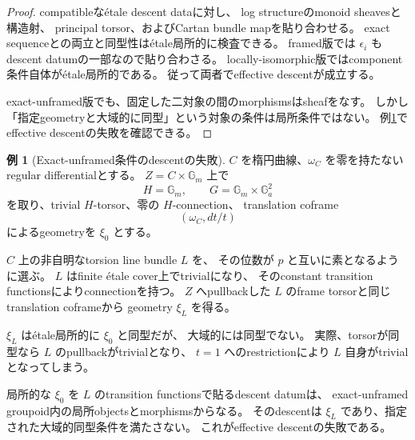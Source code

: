 \documentclass[uplatex,dvipdfmx,11pt]{jsarticle}
\numberwithin{equation}{section}
\theoremstyle{plain}
\theoremstyle{definition}
\newtheorem{example}[theorem]{例}
\theoremstyle{remark}
\newcommand{\GG}{\mathbb G}
\begin{document}
\begin{proof}
compatibleなétale descent dataに対し、
log structureのmonoid sheavesと構造射、
principal torsor、およびCartan bundle mapを貼り合わせる。
exact sequenceとの両立と同型性はétale局所的に検査できる。
framed版では \(\epsilon_i\) もdescent datumの一部なので貼り合わさる。
locally-isomorphic版ではcomponent条件自体がétale局所的である。
従って両者でeffective descentが成立する。

exact-unframed版でも、固定した二対象の間のmorphismsはsheafをなす。
しかし「指定geometryと大域的に同型」という対象の条件は局所条件ではない。
例\ref{ex:nonstack}でeffective descentの失敗を確認できる。
\end{proof}

\begin{example}[Exact-unframed条件のdescentの失敗]
\label{ex:nonstack}
\(C\) を楕円曲線、\(\omega_C\) を零を持たないregular differentialとする。
\(Z=C\times\GG_m\) 上で
\[
H=\GG_m,\qquad G=\GG_m\times\GG_a^2
\]
を取り、trivial \(H\)-torsor、零の \(H\)-connection、
translation coframe
\[
(\omega_C,dt/t)
\]
によるgeometryを \(\xi_0\) とする。

\(C\) 上の非自明なtorsion line bundle \(L\) を、
その位数が \(p\) と互いに素となるように選ぶ。
\(L\) はfinite étale cover上でtrivialになり、
そのconstant transition functionsによりconnectionを持つ。
\(Z\) へpullbackした \(L\) のframe torsorと同じtranslation coframeから
geometry \(\xi_L\) を得る。

\(\xi_L\) はétale局所的に \(\xi_0\) と同型だが、
大域的には同型でない。
実際、torsorが同型なら \(L\) のpullbackがtrivialとなり、
\(t=1\) へのrestrictionにより \(L\) 自身がtrivialとなってしまう。

局所的な \(\xi_0\) を \(L\) のtransition functionsで貼るdescent datumは、
exact-unframed groupoid内の局所objectsとmorphismsからなる。
そのdescentは \(\xi_L\) であり、指定された大域的同型条件を満たさない。
これがeffective descentの失敗である。
\end{example}
\end{document}
